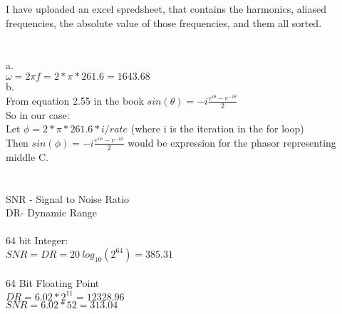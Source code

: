 \documentclass[11pt,leqno,fleqn]{article}
\begin{document}
\section{}
I have uploaded an excel spredsheet, that contains the harmonics, aliased frequencies, the absolute value of those frequencies, and them all sorted.
\section{}
a.\\
$\omega = 2 \pi f = 2 * \pi * 261.6 = 1643.68$\\
b.\\
From equation 2.55 in the book $sin(\theta) =-i \frac{e^{i \theta} - e^{-i \theta}}{2}$\\
So in our case:\\
Let $\phi = 2 * \pi * 261.6  * i/rate$ (where i is the iteration in the for loop)\\
Then $sin(\phi) = -i \frac{e^{i \phi} - e^{-i \phi}}{2}$ would be expression for the phasor representing middle C.
\section{}
SNR - Signal to Noise Ratio\\
DR- Dynamic Range\\
\\
64 bit Integer:\\
$SNR = DR = 20\ log_{10} (2^{64}) = 385.31$\\
\\
64 Bit Floating Point\\
$DR = 6.02 * 2^{11} = 12328.96$\\
$SNR = 6.02 * {52} = 313.04$\\
\end{document}
